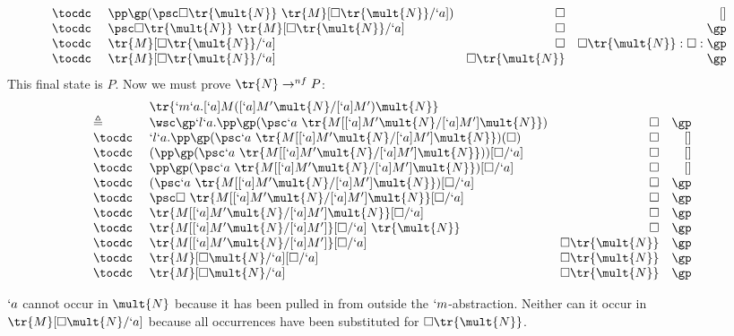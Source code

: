 \begin{Proof}
\[\begin{array}{@{}llrr}
  \tocdc\    & \pp \gp (\psc \square \tr{\mult{N}}\ \tr{M}[\square \tr{\mult{N}}/`a]) & \square & [] \\
  \tocdc\    & \psc \square \tr{\mult{N}}\ \tr{M}[\square \tr{\mult{N}}/`a] & \square  & \gp \\
  \tocdc\    & \tr{M}[\square \tr{\mult{N}}/`a] & \square & \square \tr{\mult{N}}:\square:\gp \\
  \tocdc\    & \tr{M}[\square \tr{\mult{N}}/`a] & \square \tr{\mult{N}} & \gp \\
\end{array}
\]
This final state is $P$. Now we must prove $\tr{N} \to^{nf} P$:
\[
\begin{array}{llrr}
             & \tr{`m`a.[`a]M([`a]M'\mult{N}/[`a]M')\mult{N}} \\
  \triangleq & \wsc \gp `l`a.\pp \gp (\psc `a\ \tr{M[[`a]M'\mult{N}/[`a]M']\mult{N}}) & \square & \gp \\
  \tocdc\    & `l`a.\pp \gp (\psc `a\ \tr{M[[`a]M'\mult{N}/[`a]M']\mult{N}})(\square) & \square & [] \\
  \tocdc\    & (\pp \gp (\psc `a\ \tr{M[[`a]M'\mult{N}/[`a]M']\mult{N}}))[\square/`a] & \square & [] \\
  \tocdc\    & \pp \gp (\psc `a\ \tr{M[[`a]M'\mult{N}/[`a]M']\mult{N}})[\square/`a]   & \square & [] \\
  \tocdc\    & (\psc `a\ \tr{M[[`a]M'\mult{N}/[`a]M']\mult{N}})[\square/`a]           & \square & \gp \\
  \tocdc\    & \psc \square\ \tr{M[[`a]M'\mult{N}/[`a]M']\mult{N}}[\square/`a]        & \square & \gp \\
  \tocdc\    & \tr{M[[`a]M'\mult{N}/[`a]M']\mult{N}}[\square/`a]  & \square           & \gp \\
  \tocdc\    & \tr{M[[`a]M'\mult{N}/[`a]M']}[\square/`a]\ \tr{\mult{N}}               & \square & \gp \\
  \tocdc\    & \tr{M[[`a]M'\mult{N}/[`a]M']}[\square/`a]                              & \square \tr{\mult{N}} & \gp \\
  \tocdc\    & \tr{M}[\square \mult{N}/`a][\square/`a]                                & \square \tr{\mult{N}} & \gp \\
  \tocdc\    & \tr{M}[\square \mult{N}/`a]                                            & \square \tr{\mult{N}} & \gp \\
\end{array}
\]
\begin{remark}
$`a$ cannot occur in $\mult{N}$ because it has been pulled in from outside the $`m$-abstraction.
Neither can it occur in $\tr{M}[\square \mult{N}/`a]$ because all occurrences have been substituted for $\square \tr{\mult{N}}$.
\end{remark}


\end{Proof}

